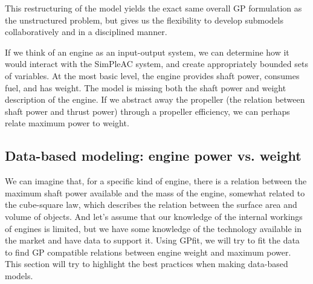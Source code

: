 This restructuring of the model yields the exact same overall \gls{GP} formulation
as the unstructured problem, but gives us the flexibility to develop submodels
collaboratively and in a disciplined manner.

If we think of an engine as an input-output system, we can determine how it
would interact with the SimPleAC system, and create appropriately bounded
sets of variables.
At the most basic level, the engine provides shaft power, consumes fuel,
and has weight. The model is missing both the shaft power and weight description
of the engine. If we abstract away the propeller (the relation between shaft
power and thrust power) through a propeller efficiency,
we can perhaps relate maximum power to weight.

\subsection{Data-based modeling: engine power vs. weight}
\label{s:datafit}

We can imagine that, for a specific kind of engine, there is a relation between the
maximum shaft power available and the mass of the engine, somewhat related to the
cube-square law, which describes the relation between the surface area and volume
of objects. And let's assume that our knowledge of the internal workings of engines
is limited, but we have some knowledge of the technology available in the market
and have data to support it. Using GPfit, we will try to fit the data to find
\gls{GP} compatible relations between engine weight and maximum power. This section
will try to highlight the best practices when making data-based models.

